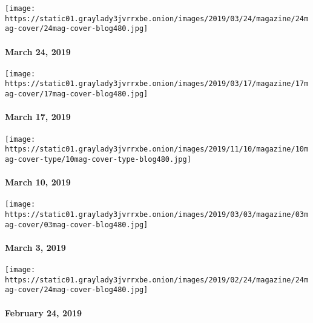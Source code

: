 \href{https://www.nytimes3xbfgragh.onion/issue/magazine/2019/03/22/the-032419-issue}{}

\texttt{[image: https://static01.graylady3jvrrxbe.onion/images/2019/03/24/magazine/24mag-cover/24mag-cover-blog480.jpg]}

\hypertarget{march-24-2019}{%
\paragraph{March 24, 2019}\label{march-24-2019}}

\href{https://www.nytimes3xbfgragh.onion/issue/magazine/2019/03/15/the-31719-issue}{}

\texttt{[image: https://static01.graylady3jvrrxbe.onion/images/2019/03/17/magazine/17mag-cover/17mag-cover-blog480.jpg]}

\hypertarget{march-17-2019}{%
\paragraph{March 17, 2019}\label{march-17-2019}}

\href{https://www.nytimes3xbfgragh.onion/interactive/2019/03/07/magazine/top-songs.html}{}

\texttt{[image: https://static01.graylady3jvrrxbe.onion/images/2019/11/10/magazine/10mag-cover-type/10mag-cover-type-blog480.jpg]}

\hypertarget{march-10-2019}{%
\paragraph{March 10, 2019}\label{march-10-2019}}

\href{https://www.nytimes3xbfgragh.onion/issue/magazine/2019/03/01/the-322019-issue}{}

\texttt{[image: https://static01.graylady3jvrrxbe.onion/images/2019/03/03/magazine/03mag-cover/03mag-cover-blog480.jpg]}

\hypertarget{march-3-2019}{%
\paragraph{March 3, 2019}\label{march-3-2019}}

\href{https://www.nytimes3xbfgragh.onion/issue/magazine/2019/02/22/the-24219-issue}{}

\texttt{[image: https://static01.graylady3jvrrxbe.onion/images/2019/02/24/magazine/24mag-cover/24mag-cover-blog480.jpg]}

\hypertarget{february-24-2019}{%
\paragraph{February 24, 2019}\label{february-24-2019}}

